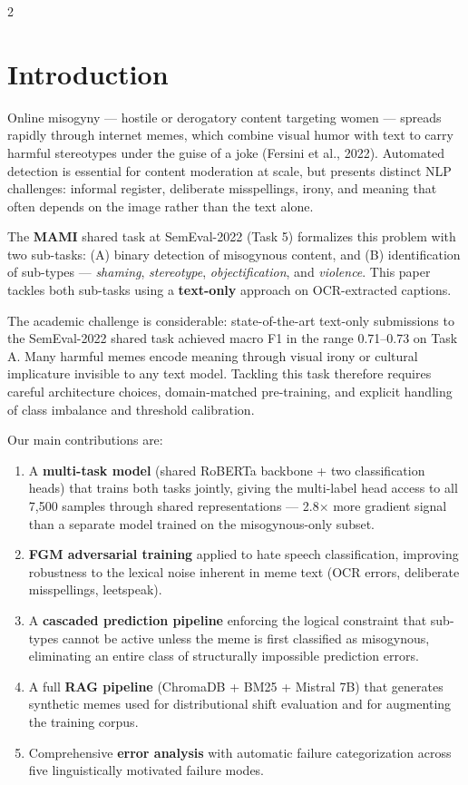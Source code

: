 \documentclass[11pt]{article}
\begin{document}
\begin{multicols}{2}

\section{Introduction}

Online misogyny — hostile or derogatory content targeting women — spreads rapidly through internet memes, which combine visual humor with text to carry harmful stereotypes under the guise of a joke (Fersini et al., 2022). Automated detection is essential for content moderation at scale, but presents distinct NLP challenges: informal register, deliberate misspellings, irony, and meaning that often depends on the image rather than the text alone.

The \textbf{MAMI} shared task at SemEval-2022 (Task 5) formalizes this problem with two sub-tasks: (A) binary detection of misogynous content, and (B) identification of sub-types — \textit{shaming}, \textit{stereotype}, \textit{objectification}, and \textit{violence}. This paper tackles both sub-tasks using a \textbf{text-only} approach on OCR-extracted captions.

The academic challenge is considerable: state-of-the-art text-only submissions to the SemEval-2022 shared task achieved macro F1 in the range 0.71–0.73 on Task A. Many harmful memes encode meaning through visual irony or cultural implicature invisible to any text model. Tackling this task therefore requires careful architecture choices, domain-matched pre-training, and explicit handling of class imbalance and threshold calibration.

Our main contributions are:
\begin{enumerate}
  \item A \textbf{multi-task model} (shared RoBERTa backbone + two classification heads) that trains both tasks jointly, giving the multi-label head access to all 7{,}500 samples through shared representations — 2.8$\times$ more gradient signal than a separate model trained on the misogynous-only subset.
  \item \textbf{FGM adversarial training} applied to hate speech classification, improving robustness to the lexical noise inherent in meme text (OCR errors, deliberate misspellings, leetspeak).
  \item A \textbf{cascaded prediction pipeline} enforcing the logical constraint that sub-types cannot be active unless the meme is first classified as misogynous, eliminating an entire class of structurally impossible prediction errors.
  \item A full \textbf{RAG pipeline} (ChromaDB + BM25 + Mistral 7B) that generates synthetic memes used for distributional shift evaluation and for augmenting the training corpus.
  \item Comprehensive \textbf{error analysis} with automatic failure categorization across five linguistically motivated failure modes.
\end{enumerate}


\end{multicols}
\end{document}
